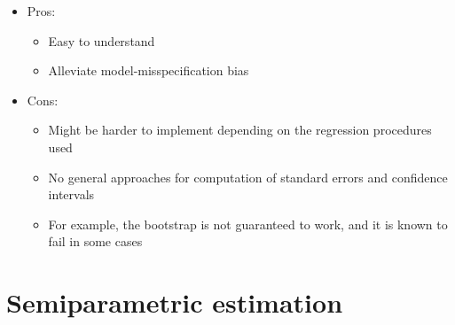 \documentclass[
  12pt,
]{book}
\providecommand{\tightlist}{%
  \setlength{\itemsep}{0pt}\setlength{\parskip}{0pt}}
\theoremstyle{definition}
\theoremstyle{definition}
\theoremstyle{definition}
\newcommand{\1}{\mathbbm{1}}
\begin{document}
\begin{itemize}
\tightlist
\item
  Pros:

  \begin{itemize}
  \tightlist
  \item
    Easy to understand
  \item
    Alleviate model-misspecification bias
  \end{itemize}
\item
  Cons:

  \begin{itemize}
  \tightlist
  \item
    Might be harder to implement depending on the regression procedures used
  \item
    No general approaches for computation of standard errors and confidence
    intervals
  \item
    For example, the bootstrap is not guaranteed to work, and it is known to
    fail in some cases
  \end{itemize}
\end{itemize}

\hypertarget{semiparametric-estimation}{%
\section{Semiparametric estimation}\label{semiparametric-estimation}}
\end{document}
